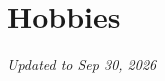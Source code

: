 \documentclass[10pt,a4paper,sans]{moderncv} %
\begin{document}

\section{Hobbies}





\begin{flushright}
    \textit{Updated to Sep 30, 2026}
\end{flushright}
\end{document}
